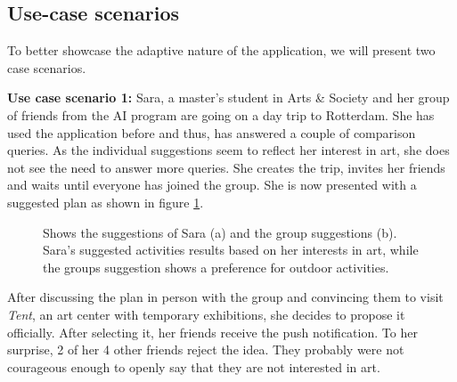 \documentclass[11pt,a4paper,oneside]{article}
\begin{document}
\subsection{Use-case scenarios}
To better showcase the adaptive nature of the application, we will present two case scenarios.

\textbf{Use case scenario 1:} Sara, a master’s student in Arts \& Society and her group of friends from the AI program are going on a day trip to Rotterdam. She has used the application before and thus, has answered a couple of comparison queries. As the individual suggestions seem to reflect her interest in art, she does not see the need to answer more queries. She creates the trip, invites her friends and waits until everyone has joined the group. She is now presented with a suggested plan as shown in figure \ref{fig:saras_results}.

\begin{figure}[H]
    \centering
    \qquad
    \caption{Shows the suggestions of Sara (a) and the group suggestions (b). Sara's suggested activities results based on her interests in art, while the groups suggestion shows a preference for outdoor activities.}%
    \label{fig:saras_results}%
\end{figure}

After discussing the plan in person with the group and convincing them to visit \emph{Tent}, an art center with temporary exhibitions, she decides to propose it officially. After selecting it, her friends receive the push notification. To her surprise, 2 of her 4 other friends reject the idea. They probably were not courageous enough to openly say that they are not interested in art.  
\end{document}
